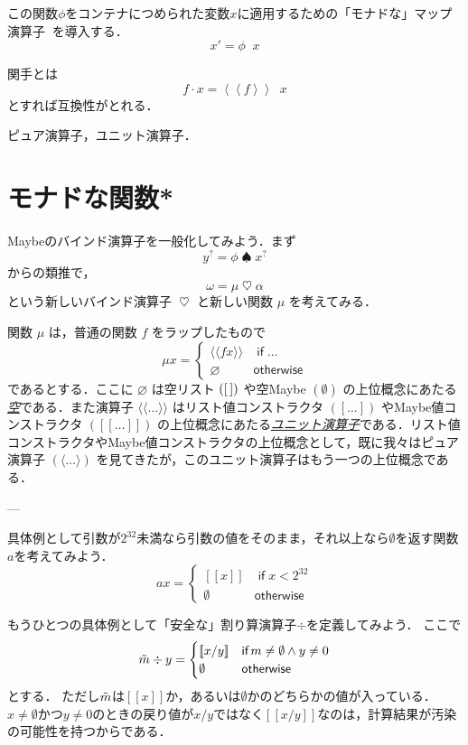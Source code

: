 \documentclass[a4paper]{jsbook}
\def\[{\left[\!\left[}
\def\]{\right]\!\right]}
\newcommand{\keyword}[1]{{\underline{\emph{#1}}}}
\newcommand{\mNothing}{\emptyset}
\newcommand{\mPureNothing}{\varnothing}
\newcommand{\mKeyword}[1]{\mathsf{#1}}
\newcommand{\mIfKeyword}{\mKeyword{if}}
\newcommand{\mOtherwiseKeyword}{\mKeyword{otherwise}}
\newcommand{\mListWith}[1]{\left[#1\right]}
\newcommand{\mMaybeWith}[1]{\[#1\]}
\newcommand{\mUnitWith}[1]{\langle\!\langle#1\rangle\!\rangle}
\newcommand{\mPureWith}[1]{\langle#1\rangle}
\newcommand{\mMaybe}[1]{{#1}^\text{?}}
\DeclareMathOperator{\mBindMaybe}{\spadesuit}%
\DeclareMathOperator{\mBind}{\heartsuit}%
\DeclareMathOperator{\mIf}{\mIfKeyword}
\DeclareMathOperator{\mOtherwise}{\mOtherwiseKeyword}
\newcommand{\mathMaybeVar}[1]{\Tilde{#1}}
\newcommand{\mathMaybeWith}[1]{\[#1\]}
\newcommand{\mathUnitWith}[1]{\left\langle\!\left\langle#1\right\rangle\!\right\rangle}
\newcommand{\mathNothing}{\emptyset}
\newcommand{\mathAnd}{\mathbin{\wedge}}
\newcommand{\mathGeneralMap}{\mathbin{\cdot}}
\newcommand{\mathKeyword}[1]{\operatorname{\textsf{#1}}}
\newcommand{\mathIf}{\mathKeyword{if}}
\newcommand{\mathOtherwise}{\mathKeyword{otherwise}}
\DeclareMathOperator{\hsklMonadMap}{{DO NOT USE}--\heartsuit}
\begin{document}
この関数$\phi$をコンテナにつめられた変数$x$に適用するための「モナドな」マップ演算子$\hsklMonadMap$を導入する．
$$x'=\phi\hsklMonadMap x$$

関手とは
$$f\mathGeneralMap x=\mathUnitWith{f}\hsklMonadMap x$$
とすれば互換性がとれる．


ピュア演算子，ユニット演算子．


\section{モナドな関数*}

Maybeのバインド演算子を一般化してみよう．まず
\begin{equation}
\mMaybe{y}=\phi\mBindMaybe\mMaybe{x}
\end{equation}
からの類推で，
\begin{equation}
\omega=\mu\mBind\alpha
\end{equation}
という新しいバインド演算子 $\mBind$ と新しい関数 $\mu$ を考えてみる．

関数 $\mu$ は，普通の関数 $f$ をラップしたもので
\begin{equation}
\mu x=\begin{cases}
\mUnitWith{fx}&\mIf\dots\\
\mPureNothing&\mOtherwise
\end{cases}
\end{equation}
であるとする．ここに $\mPureNothing$ は空リスト $({[\,]})$ や空Maybe $(\mNothing)$ の上位概念にあたる\keyword{空}である．また演算子 $\mUnitWith{\dots}$ はリスト値コンストラクタ $(\mListWith{\dots})$ やMaybe値コンストラクタ $(\mMaybeWith{\dots})$ の上位概念にあたる\keyword{ユニット演算子}である．リスト値コンストラクタやMaybe値コンストラクタの上位概念として，既に我々はピュア演算子 $(\mPureWith{\dots})$ を見てきたが，このユニット演算子はもう一つの上位概念である．


---

具体例として引数が$2^{32}$未満なら引数の値をそのまま，それ以上なら$\mathNothing$を返す関数$a$を考えてみよう．
\begin{equation}
ax=\begin{cases}
\mathMaybeWith{x}&\mathIf x<2^{32}\\
\mathNothing&\mathOtherwise
\end{cases}
\end{equation}


もうひとつの具体例として「安全な」割り算演算子$\div$を定義してみよう．
ここで
\begin{equation}
\mathMaybeVar{m}\div y=\begin{cases}\mathMaybeWith{x/y}&\mathIf m\neq\mathNothing\mathAnd y\neq0\\
\mathNothing&\mathOtherwise\end{cases}
\end{equation}
とする．
ただし$\mathMaybeVar{m}$は$\mathMaybeWith{x}$か，あるいは$\mathNothing$かのどちらかの値が入っている．
$x\neq\mathNothing$かつ$y\neq0$のときの戻り値が$x/y$ではなく$\mathMaybeWith{x/y}$なのは，計算結果が汚染の可能性を持つからである．
\end{document}
